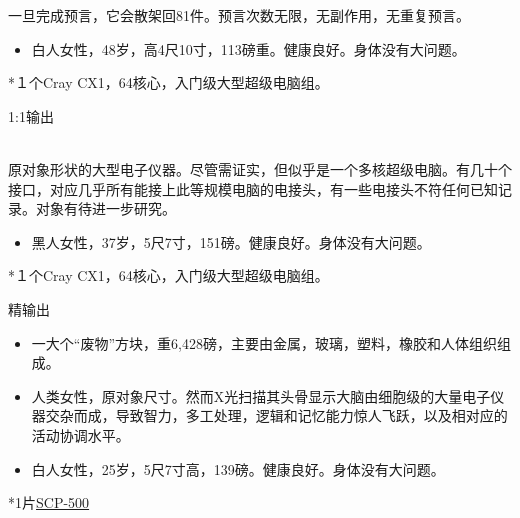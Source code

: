 一旦完成预言，它会散架回81件。预言次数无限，无副作用，无重复预言。




\begin{itemize}
\item 白人女性，48岁，高4尺10寸，113磅重。健康良好。身体没有大问题。
\end{itemize}

*１个Cray CX1，64核心，入门级大型超级电脑组。

1:1输出

\\
原对象形状的大型电子仪器。尽管需证实，但似乎是一个多核超级电脑。有几十个接口，对应几乎所有能接上此等规模电脑的电接头，有一些电接头不符任何已知记录。对象有待进一步研究。





\begin{itemize}
\item 黑人女性，37岁，5尺7寸，151磅。健康良好。身体没有大问题。
\end{itemize}

*１个Cray CX1，64核心，入门级大型超级电脑组。

精输出


\begin{itemize}
\item 一大个“废物”方块，重6,428磅，主要由金属，玻璃，塑料，橡胶和人体组织组成。
\item 人类女性，原对象尺寸。然而X光扫描其头骨显示大脑由细胞级的大量电子仪器交杂而成，导致智力，多工处理，逻辑和记忆能力惊人飞跃，以及相对应的活动协调水平。
\end{itemize}




\begin{itemize}
\item 白人女性，25岁，5尺7寸高，139磅。健康良好。身体没有大问题。
\end{itemize}

*1片\hyperref[chap:SCP-500]{SCP-500}

